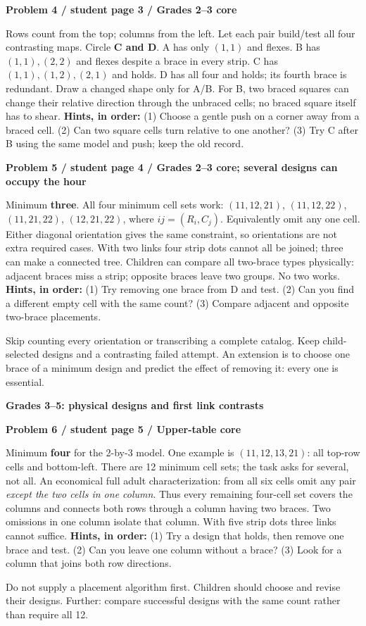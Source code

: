 \documentclass[letterpaper,11pt]{article}
\newcommand{\titleline}[1]{\par{\large\bfseries #1}\par}
\newcommand{\sub}[1]{\par\textbf{#1}\par}
\newcommand{\task}[3]{\sub{Problem #1 / student page #2 / #3}}
\newcommand{\hints}[3]{\textbf{Hints, in order:} (1) #1 (2) #2 (3) #3\par}
\begin{document}
\task{4}{3}{Grades 2--3 core}
Rows count from the top; columns from the left. Let each pair build/test all four contrasting maps. Circle \textbf{C and D}. A has only $(1,1)$ and flexes. B has $(1,1),(2,2)$ and flexes despite a brace in every strip. C has $(1,1),(1,2),(2,1)$ and holds. D has all four and holds; its fourth brace is redundant. Draw a changed shape only for A/B. For B, two braced squares can change their relative direction through the unbraced cells; no braced square itself has to shear.
\hints{Choose a gentle push on a corner away from a braced cell.}{Can two square cells turn relative to one another?}{Try C after B using the same model and push; keep the old record.}

\task{5}{4}{Grades 2--3 core; several designs can occupy the hour}
Minimum \textbf{three}. All four minimum cell sets work: $(11,12,21)$, $(11,12,22)$, $(11,21,22)$, $(12,21,22)$, where $ij=(R_i,C_j)$. Equivalently omit any one cell. Either diagonal orientation gives the same constraint, so orientations are not extra required cases. With two links four strip dots cannot all be joined; three can make a connected tree. Children can compare all two-brace types physically: adjacent braces miss a strip; opposite braces leave two groups. No two works.
\hints{Try removing one brace from D and test.}{Can you find a different empty cell with the same count?}{Compare adjacent and opposite two-brace placements.}
Skip counting every orientation or transcribing a complete catalog. Keep child-selected designs and a contrasting failed attempt. An extension is to choose one brace of a minimum design and predict the effect of removing it: every one is essential.

\newpage
\titleline{Grades 3--5: physical designs and first link contrasts}
\task{6}{5}{Upper-table core}
Minimum \textbf{four} for the 2-by-3 model. One example is $(11,12,13,21)$: all top-row cells and bottom-left. There are 12 minimum cell sets; the task asks for several, not all. An economical full adult characterization: from all six cells omit any pair \emph{except the two cells in one column}. Thus every remaining four-cell set covers the columns and connects both rows through a column having two braces. Two omissions in one column isolate that column. With five strip dots three links cannot suffice.
\hints{Try a design that holds, then remove one brace and test.}{Can you leave one column without a brace?}{Look for a column that joins both row directions.}
Do not supply a placement algorithm first. Children should choose and revise their designs. Further: compare successful designs with the same count rather than require all 12.
\end{document}
